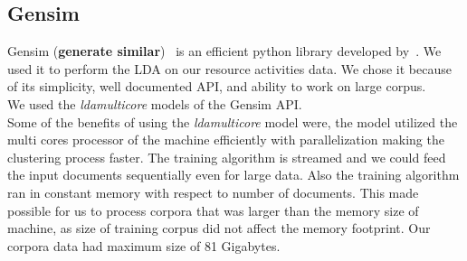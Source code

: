 \subsection{Gensim}
\label{sub:Gensim}
Gensim (\textbf{generate similar})~\cite[]{gensim} is an efficient python library developed by~\citeauthor{gensim}. We used it to perform the LDA on our resource activities data. We chose it because of its simplicity, well documented API, and ability to work on large corpus.\\
We used the \emph{ldamulticore}\cite[]{ldamulticore}  models of the Gensim API.\\
Some of the benefits of using the \emph{ldamulticore} model were, the model utilized the multi cores processor of the machine efficiently with parallelization making the clustering process faster.
The training algorithm is streamed and we could feed the input documents sequentially even for large data.
Also the training algorithm ran in constant memory with respect to number of documents. This made possible for us to process corpora that was larger than the memory size of machine, as size of training corpus did not affect the memory footprint. Our corpora data had maximum size of 81 Gigabytes.

